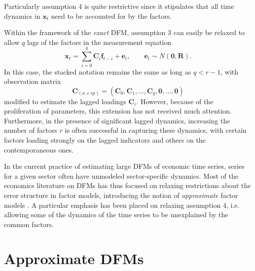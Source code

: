 \documentclass[a4paper]{article}
\begin{document}
Particularly assumption 4 is quite restrictive since it stipulates that all time dynamics in $\textbf{x}_t$ need to be accounted for by the factors. \newline

Within the framework of the \emph{exact} DFM, assumption 3 can easily be relaxed to allow $q$ lags of the factors in the measurement equation
\begin{equation}
\textbf{x}_t = \sum_{i=0}^q \textbf{C}_i \textbf{f}_{t-i} + \textbf{e}_t, \qquad \textbf{e}_t\sim N(\textbf{0}, \textbf{R}).
\end{equation}
In this case, the stacked notation remains the same as long as $q < r-1$, with observation matrix 
\begin{equation} \label{eq:Clags}
\textbf{C}_{(n \times rp)}  = (\textbf{C}_0, \textbf{C}_1, \dots, \textbf{C}_q, \textbf{0}, \dots, \textbf{0})
\end{equation}
modified to estimate the lagged loadings $\textbf{C}_i$. However, because of the proliferation of parameters, this extension has not received much attention. Furthermore, in the presence of significant lagged dynamics, increasing the number of factors $r$ is often successful in capturing these dynamics, with certain factors loading strongly on the lagged indicators and others on the contemporaneous ones. \newline


In the current practice of estimating large DFMs of economic time series, series for a given sector often have unmodeled sector-specific dynamics. Most of the economics literature on DFMs has thus focused on relaxing restrictions about the error structure in factor models, introducing the notion of \emph{approximate} factor models \citep{stock2016dynamic}. A particular emphasis has been placed on relaxing assumption 4, i.e. allowing some of the dynamics of the time series to be unexplained by the common factors. 


\section{Approximate DFMs}
\end{document}
